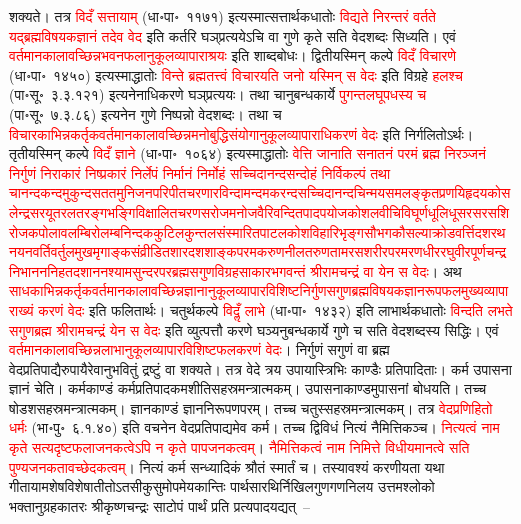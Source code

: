 \begin{sloppypar}
शक्यते। तत्र \textcolor{red}{विदँ सत्तायाम्} (धा॰पा॰~११७१) इत्यस्मात्सत्तार्थक\-धातोः \textcolor{red}{विद्यते निरन्तरं वर्तते यद्ब्रह्म\-विषयक\-ज्ञानं तदेव वेद} इति कर्तरि घञ्‌प्रत्ययेऽचि वा गुणे कृते सति वेद\-शब्दः सिध्यति। एवं \textcolor{red}{वर्तमान\-कालावच्छिन्न\-भवन\-फलानुकूल\-व्यापाराश्रयः} इति शाब्द\-बोधः। द्वितीयस्मिन् कल्पे \textcolor{red}{विदँ विचारणे} (धा॰पा॰~१४५०) इत्यस्माद्धातोः \textcolor{red}{विन्ते ब्रह्मतत्त्वं विचारयति जनो यस्मिन् स वेदः} इति विग्रहे \textcolor{red}{हलश्च} (पा॰सू॰~३.३.१२१) इत्यनेनाधिकरणे घञ्‌प्रत्ययः। तथा चानुबन्ध\-कार्ये \textcolor{red}{पुगन्तलघूपधस्य च} (पा॰सू॰~७.३.८६) इत्यनेन गुणे निष्पन्नो वेद\-शब्दः। तथा च \textcolor{red}{विचारकाभिन्न\-कर्तृक\-वर्तमान\-कालावच्छिन्न\-मनो\-बुद्धि\-संयोगानुकूल\-व्यापाराधिकरणं वेदः} इति निर्गलितोऽर्थः। तृतीयस्मिन् कल्पे \textcolor{red}{विदँ ज्ञाने} (धा॰पा॰~१०६४) इत्यस्माद्धातोः \textcolor{red}{वेत्ति जानाति सनातनं परमं ब्रह्म निरञ्जनं निर्गुणं निराकारं निष्प्रकारं निर्लेपं निर्मानं निर्मोहं सच्चिदानन्द\-सन्दोहं निर्विकल्पं तथा चानन्द\-कन्द\-मुकुन्द\-सतत\-मुनिजन\-परिपीत\-चरणारविन्दामन्द\-मकरन्द\-सच्चिदानन्द\-चिन्मय\-समलङ्कृत\-प्रणयि\-हृदय\-कोसलेन्द्र\-सरयू\-तरल\-तरङ्ग\-भङ्गि\-विक्षालित\-चरण\-सरोज\-मनोज\-वैरि\-वन्दित\-पाद\-पयोज\-कोशल\-वीचि\-विघूर्ण\-धूलि\-धूसर\-सरस\-शिरोज\-कपोलावलम्बि\-रोलम्ब\-निन्दक\-कुटिल\-कुन्तल\-संस्मारित\-पाटल\-कोश\-विहारि\-भृङ्ग\-सौभग\-कौसल्या\-क्रोड\-वर्त्ति\-दशरथ\-नयन\-वर्ति\-वर्तुल\-मुख\-मृगाङ्क\-संव्रीडित\-शारद\-शशाङ्क\-परम\-करुण\-नील\-तरुण\-तामरस\-शरीर\-परम\-रणधीर\-रघुवीर\-पूर्णचन्द्र\-निभानन\-निहत\-दशानन\-श्याम\-सुन्दर\-पर\-ब्रह्म\-सगुण\-विग्रह\-साकार\-भगवन्तं श्रीरामचन्द्रं वा येन स वेदः}। अथ \textcolor{red}{साधकाभिन्न\-कर्तृक\-वर्तमान\-कालावच्छिन्न\-ज्ञानानुकूल\-व्यापार\-विशिष्ट\-निर्गुण\-सगुण\-ब्रह्म\-विषयक\-ज्ञान\-रूप\-फल\-मुख्य\-व्यापाराख्यं करणं वेदः} इति फलितार्थः। चतुर्थकल्पे \textcolor{red}{विदॢँ लाभे} (धा॰पा॰~१४३२) इति लाभार्थक\-धातोः \textcolor{red}{विन्दति लभते सगुण\-ब्रह्म श्रीरामचन्द्रं येन स वेदः} इति व्युत्पत्तौ करणे घञ्यनुबन्ध\-कार्ये गुणे च सति वेदशब्दस्य सिद्धिः। एवं \textcolor{red}{वर्तमान\-कालावच्छिन्न\-लाभानुकूल\-व्यापारविशिष्ट\-फलकरणं वेदः}। निर्गुणं सगुणं वा ब्रह्म वेद\-प्रतिपाद्यैरुपायैरेवानु\-भवितुं द्रष्टुं वा शक्यते। तत्र वेदे त्रय उपायास्त्रिभिः काण्डैः प्रतिपादिताः। कर्म उपासना ज्ञानं चेति। कर्मकाण्डं कर्म\-प्रति\-पादकमशीति\-सहस्रमन्त्रात्मकम्। उपासना\-काण्डमुपासनां बोधयति। तच्च षोडश\-सहस्र\-मन्त्रात्मकम्। ज्ञान\-काण्डं ज्ञान\-निरूपण\-परम्। तच्च चतुस्सहस्र\-मन्त्रात्मकम्। तत्र \textcolor{red}{वेद\-प्रणिहितो धर्मः} (भा॰पु॰~६.१.४०) इति वचनेन वेदप्रतिपाद्यमेव कर्म। तच्च द्विविधं नित्यं नैमित्तिकञ्च। \textcolor{red}{नित्यत्वं नाम कृते सत्यदृष्ट\-फलाजनकत्वेऽपि न कृते पापजनकत्वम्}।
\textcolor{red}{नैमित्तिकत्वं नाम निमित्ते विधीयमानत्वे सति पुण्य\-जनकतावच्छेदकत्वम्}। नित्यं कर्म सन्ध्यादिकं श्रौतं स्मार्तं च। तस्यावश्यं करणीयता यथा गीतायामशेष\-विशेषातीतोऽतसी\-कुसुमोपमेय\-कान्तिः पार्थ\-सारथिर्निखिल\-गुण\-गण\-निलय उत्तम\-श्लोको भक्तानुग्रह\-कातरः श्रीकृष्ण\-चन्द्रः साटोपं पार्थं प्रति प्रत्य\-पादयद्यत्~–\end{sloppypar}
